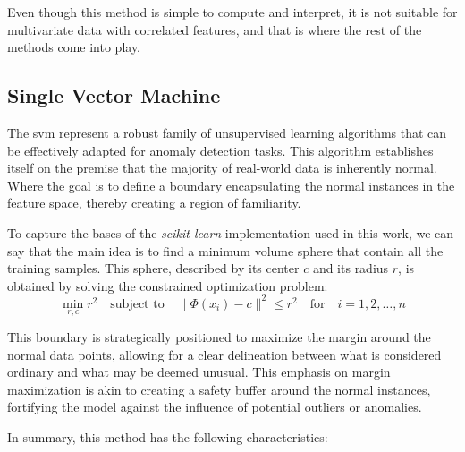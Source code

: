\documentclass[11pt,english,a4paper,hidelinks]{book}
\begin{document}
\noindent Even though this method is simple to compute and interpret, it is not suitable for multivariate data with correlated features, and that is where the rest of the methods come into play.

\subsection{Single Vector Machine}

\noindent The \gls{svm} represent a robust family of unsupervised learning algorithms that can be effectively adapted for anomaly detection tasks. This algorithm establishes itself on the premise that the majority of real-world data is inherently normal. Where the goal is to define a boundary encapsulating the normal instances in the feature space, thereby creating a region of familiarity. 

\vspace{0.5cm}
\noindent To capture the bases of the \textit{scikit-learn} implementation \cite{scikit2025oneclasssvm} used in this work, we can say that the main idea is to find a minimum volume sphere that contain all the training samples. This sphere, described by its center \(c\) and its radius \(r\), is obtained by solving the constrained optimization problem: \cite{zineb2012simple}
\begin{equation}
\min_{r,c} r^2 \quad \text{subject to} \quad \|\Phi(x_i) - c\|^2 \leq r^2 \quad \text{for} \quad i = 1, 2, \ldots, n
\end{equation}

\vspace{0.5cm}
\noindent This boundary is strategically positioned to maximize the margin around the normal data points, allowing for a clear delineation between what is considered ordinary and what may be deemed unusual. This emphasis on margin maximization is akin to creating a safety buffer around the normal instances, fortifying the model against the influence of potential outliers or anomalies.

\vspace{0.5cm}
\noindent In summary, this method has the following characteristics:
\end{document}
